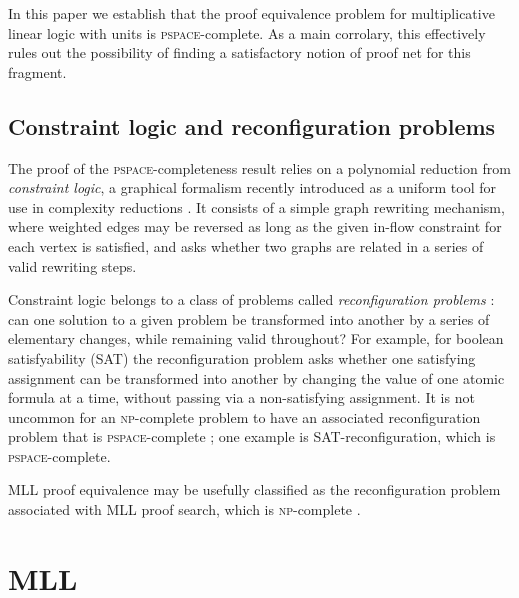 \documentclass[conference]{IEEEtran}
\begin{document}
In this paper we establish that the proof equivalence problem for multiplicative linear logic with units is \textsc{pspace}-complete.
%
As a main corrolary, this effectively rules out the possibility of finding a satisfactory notion of proof net for this fragment.



\subsection*{Constraint logic and reconfiguration problems}

The proof of the \textsc{pspace}-completeness result relies on a polynomial reduction from %
\emph{constraint logic}, a graphical formalism recently introduced as a uniform tool for use in complexity reductions \cite{Demaine-Hearn-2008}.
%
It consists of a simple graph rewriting mechanism, where weighted edges may be reversed as long as the given in-flow constraint for each vertex is satisfied, and asks whether two graphs are related in a series of valid rewriting steps.



Constraint logic belongs to a class of problems called \emph{reconfiguration problems} \cite{ReconfigurationProblems}: can one solution to a given problem be transformed into another by a series of elementary changes, while remaining valid throughout?
%
For example, for boolean satisfyability (SAT) the reconfiguration problem asks whether one satisfying assignment can be transformed into another by changing the value of one atomic formula at a time, without passing via a non-satisfying assignment.
%
It is not uncommon for an \textsc{np}-complete problem to have an associated reconfiguration problem that is \textsc{pspace}-complete \cite{ReconfigurationProblems}; one example is SAT-reconfiguration, which is \textsc{pspace}-complete.



MLL proof equivalence may be usefully classified as the reconfiguration problem associated with MLL proof search, which is \textsc{np}-complete \cite{Kanovich-1992}.





\section{MLL}
\end{document}
